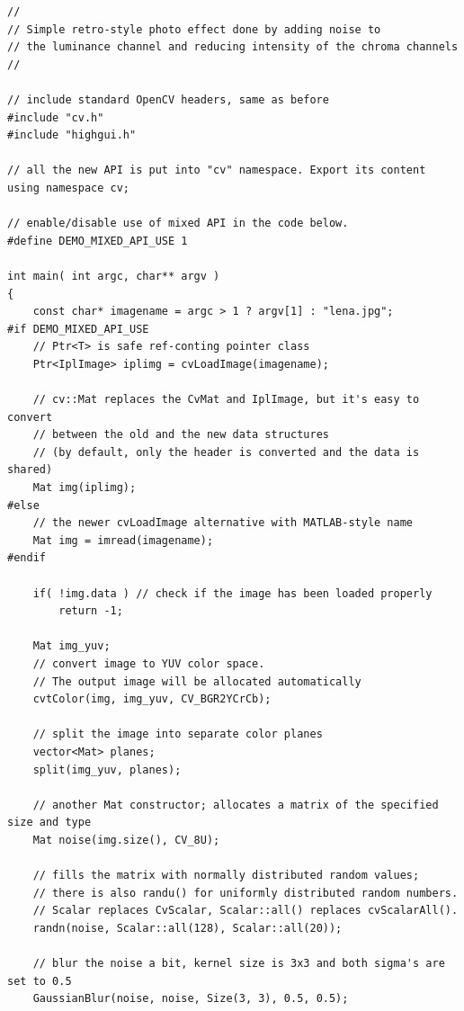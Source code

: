 \begin{lstlisting}
//
// Simple retro-style photo effect done by adding noise to
// the luminance channel and reducing intensity of the chroma channels
//

// include standard OpenCV headers, same as before
#include "cv.h"
#include "highgui.h"

// all the new API is put into "cv" namespace. Export its content
using namespace cv;

// enable/disable use of mixed API in the code below.
#define DEMO_MIXED_API_USE 1

int main( int argc, char** argv )
{
    const char* imagename = argc > 1 ? argv[1] : "lena.jpg";
#if DEMO_MIXED_API_USE
    // Ptr<T> is safe ref-conting pointer class
    Ptr<IplImage> iplimg = cvLoadImage(imagename);
    
    // cv::Mat replaces the CvMat and IplImage, but it's easy to convert
    // between the old and the new data structures
    // (by default, only the header is converted and the data is shared)
    Mat img(iplimg); 
#else
    // the newer cvLoadImage alternative with MATLAB-style name
    Mat img = imread(imagename);
#endif

    if( !img.data ) // check if the image has been loaded properly
        return -1;

    Mat img_yuv;
    // convert image to YUV color space.
    // The output image will be allocated automatically
    cvtColor(img, img_yuv, CV_BGR2YCrCb); 

    // split the image into separate color planes
    vector<Mat> planes;
    split(img_yuv, planes);

    // another Mat constructor; allocates a matrix of the specified size and type
    Mat noise(img.size(), CV_8U);
    
    // fills the matrix with normally distributed random values;
    // there is also randu() for uniformly distributed random numbers. 
    // Scalar replaces CvScalar, Scalar::all() replaces cvScalarAll().
    randn(noise, Scalar::all(128), Scalar::all(20));
                                                     
    // blur the noise a bit, kernel size is 3x3 and both sigma's are set to 0.5
    GaussianBlur(noise, noise, Size(3, 3), 0.5, 0.5);


\end{lstlisting}

